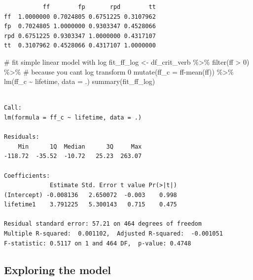 \documentclass[
  letterpaper,
  DIV=11,
  numbers=noendperiod]{scrartcl}
\newenvironment{Shaded}{\begin{snugshade}}{\end{snugshade}}
\newcommand{\AttributeTok}[1]{\textcolor[rgb]{0.40,0.45,0.13}{#1}}
\newcommand{\CommentTok}[1]{\textcolor[rgb]{0.37,0.37,0.37}{#1}}
\newcommand{\DecValTok}[1]{\textcolor[rgb]{0.68,0.00,0.00}{#1}}
\newcommand{\FunctionTok}[1]{\textcolor[rgb]{0.28,0.35,0.67}{#1}}
\newcommand{\NormalTok}[1]{\textcolor[rgb]{0.00,0.23,0.31}{#1}}
\newcommand{\OtherTok}[1]{\textcolor[rgb]{0.00,0.23,0.31}{#1}}
\newcommand{\SpecialCharTok}[1]{\textcolor[rgb]{0.37,0.37,0.37}{#1}}
\begin{document}
\begin{tcolorbox}
\begin{verbatim}
           ff        fp       rpd        tt
ff  1.0000000 0.7024805 0.6751225 0.3107962
fp  0.7024805 1.0000000 0.9303347 0.4528066
rpd 0.6751225 0.9303347 1.0000000 0.4317107
tt  0.3107962 0.4528066 0.4317107 1.0000000
\end{verbatim}

\begin{Shaded}
\begin{Highlighting}[]
\CommentTok{\# fit simple linear model with log}
\NormalTok{fit\_ff\_log }\OtherTok{\textless{}{-}}\NormalTok{ df\_crit\_verb }\SpecialCharTok{\%\textgreater{}\%}
  \FunctionTok{filter}\NormalTok{(ff }\SpecialCharTok{\textgreater{}} \DecValTok{0}\NormalTok{) }\SpecialCharTok{\%\textgreater{}\%} \CommentTok{\# because you can\textquotesingle{}t log transform 0}
  \FunctionTok{mutate}\NormalTok{(}\AttributeTok{ff\_c =}\NormalTok{ ff}\SpecialCharTok{{-}}\FunctionTok{mean}\NormalTok{(ff)) }\SpecialCharTok{\%\textgreater{}\%}
  \FunctionTok{lm}\NormalTok{(ff\_c }\SpecialCharTok{\textasciitilde{}}\NormalTok{ lifetime, }\AttributeTok{data =}\NormalTok{ .)}
\FunctionTok{summary}\NormalTok{(fit\_ff\_log)}
\end{Highlighting}
\end{Shaded}

\begin{verbatim}

Call:
lm(formula = ff_c ~ lifetime, data = .)

Residuals:
    Min      1Q  Median      3Q     Max 
-118.72  -35.52  -10.72   25.23  263.07 

Coefficients:
             Estimate Std. Error t value Pr(>|t|)
(Intercept) -0.008136   2.650072  -0.003    0.998
lifetime1    3.791225   5.300143   0.715    0.475

Residual standard error: 57.21 on 464 degrees of freedom
Multiple R-squared:  0.001102,  Adjusted R-squared:  -0.001051 
F-statistic: 0.5117 on 1 and 464 DF,  p-value: 0.4748
\end{verbatim}

\end{tcolorbox}

\hypertarget{exploring-the-model}{%
\subsection{Exploring the model}\label{exploring-the-model}}
\end{document}
